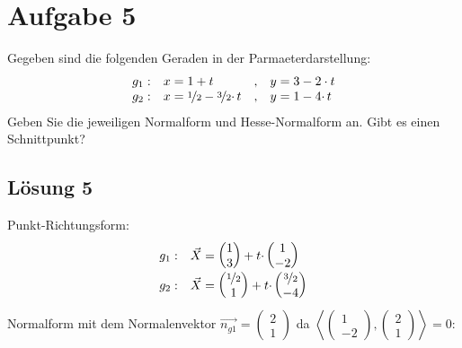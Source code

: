 \documentclass[main.tex]{subfiles}
\begin{document}
\section{Aufgabe 5}
Gegeben sind die folgenden Geraden in der Parmaeterdarstellung:
\begin{equation*}
    \begin{array}{ c l c l }
        g_{1} : & x=1+t & , & y=3-2\cdot t\\
        g_{2} : & x=\nicefrac{1}{2} -\nicefrac{3}{2} \cdotp t & , & y=1-4\cdotp t
    \end{array}
\end{equation*}
Geben Sie die jeweiligen Normalform und Hesse-Normalform an. Gibt es einen Schnittpunkt?

\subsection{Lösung 5}
Punkt-Richtungsform:
\begin{equation*}
    \begin{array}{ c l }
        g_{1} : & \vec{X} =\begin{pmatrix}
        1\\
        3
        \end{pmatrix} +t\cdotp \begin{pmatrix}
        1\\
        -2
        \end{pmatrix}\\
        g_{2} : & \vec{X} =\begin{pmatrix}
        \nicefrac{1}{2}\\
        1
        \end{pmatrix} +t\cdotp \begin{pmatrix}
        \nicefrac{3}{2}\\
        -4
        \end{pmatrix}
    \end{array}
\end{equation*}
Normalform mit dem Normalenvektor $\overrightarrow{n_{g1}} =\begin{pmatrix}
2\\
1
\end{pmatrix}$ da $\left< \begin{pmatrix}
1\\
-2
\end{pmatrix} ,\begin{pmatrix}
2\\
1
\end{pmatrix}\right> =0$:
\end{document}
